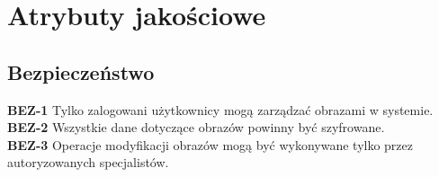 \documentclass{scrreprt}
\begin{document}
\chapter{Atrybuty jako\'sciowe}

\section{Bezpieczeństwo}
\textbf{\textcolor{myBlue}{BEZ-1}} Tylko zalogowani użytkownicy mogą zarządzać obrazami w systemie. \\ 
\textbf{\textcolor{myBlue}{BEZ-2}} Wszystkie dane dotyczące obrazów powinny być szyfrowane. \\ 
\textbf{\textcolor{myBlue}{BEZ-3}} Operacje modyfikacji obrazów mogą być wykonywane tylko przez autoryzowanych specjalistów. \\ 
\end{document}
